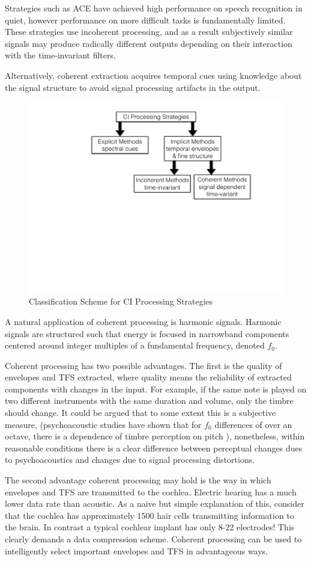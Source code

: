 \documentclass [11pt, proquest,oneside] {ganter_thesis}[2015/03/03]
\begin{document}
Strategies such as ACE have achieved high performance on speech recognition in quiet, however performance on more difficult tasks is fundamentally limited.  These strategies use incoherent processing, and as a result subjectively similar signals may produce radically different outputs depending on their interaction with the time-invariant filters.

Alternatively, coherent extraction acquires temporal cues using knowledge about the signal structure to avoid signal processing artifacts in the output.

\begin{figure}[!ht]
  \centering
    \includegraphics[width=.6\textwidth]{explicitVimplicit}   
    \caption{Classification Scheme for CI Processing Strategies}\label{fig:explicitVimplicit}
\end{figure}

A natural application of coherent processing is harmonic signals.  Harmonic signals are structured such that energy is focused in narrowband components centered around integer multiples of a fundamental frequency, denoted $f_0$.

Coherent processing has two possible advantages.  The first is the quality of envelopes and TFS extracted, where quality means the reliability of extracted components with changes in the input.  For example, if the same note is played on two different instruments with the same duration and volume, only the timbre should change.  It could be argued that to some extent this is a subjective measure, (psychoacoustic studies have shown that for $f_0$ differences of over an octave, there is a dependence of timbre perception on pitch \cite{marozeau2003dependency}), nonetheless, within reasonable conditions there is a clear difference between perceptual changes dues to psychoacoustics and changes due to signal processing distortions.

The second advantage coherent processing may hold is the way in which envelopes and TFS are transmitted to the cochlea.  Electric hearing has a much lower data rate than acoustic.  As a naive but simple explanation of this, consider that the cochlea has approximately 1500 hair cells transmitting information to the brain.  In contrast a typical cochlear implant has only 8-22 electrodes!  This clearly demands a data compression scheme.  Coherent processing can be used to intelligently select important envelopes and TFS in advantageous ways.
\end{document}
